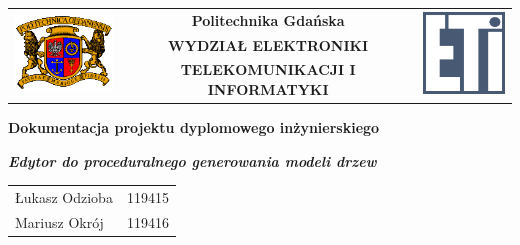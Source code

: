 \documentclass[a4paper,12pt]{report}
\begin{document}
\begin{table}[!ht]
	\begin{center}
		\begin{tabular}{lcr}
		\multirow{3}{*}{\includegraphics[width=30mm]{images/logo1.png}} &
		
		\vspace{5mm}
		
		\textbf{Politechnika Gdańska} &
		\multirow{3}{*}{\includegraphics[width=25mm]{images/logo2.png}}\\
		& \textbf{WYDZIAŁ ELEKTRONIKI} & \\
		& \textbf{TELEKOMUNIKACJI I INFORMATYKI} &
		\end{tabular}
	\end{center}
\end{table}

\vspace{15mm}

\begin{par}
	\centering
		\textbf{\large{
				Dokumentacja projektu dyplomowego inżynierskiego
		}}
		
		\vspace{10mm}
		
		\emph{\textbf{\Huge{
				Edytor do proceduralnego generowania modeli drzew
		}}}
	
	
	\vspace{15mm}
	
	\begin{table}[!ht]
		\begin{center}
			\begin{tabular}{lc}
				Łukasz Odzioba & 119415 \\
				Mariusz Okrój & 119416 
			\end{tabular}
		\end{center}
	\end{table}
\end{par}
\end{document}
